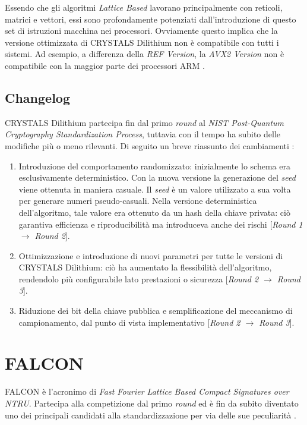 Essendo che gli algoritmi \textit{Lattice Based} lavorano principalmente con reticoli, matrici e vettori, essi sono profondamente potenziati dall'introduzione di questo set di istruzioni macchina nei processori. Ovviamente questo implica che la versione ottimizzata di CRYSTALS Dilithium non è compatibile con tutti i sistemi. Ad esempio, a differenza della \textit{REF Version}, la \textit{AVX2 Version} non è compatibile con la maggior parte dei processori ARM \cite{nist-pqc}.

\subsection{Changelog}

CRYSTALS Dilithium partecipa fin dal primo \textit{round} al \textit{NIST Post-Quantum Cryptography Standardization Process}\cite{nist-pqc}, tuttavia con il tempo ha subito delle modifiche più o meno rilevanti. Di seguito un breve riassunto dei cambiamenti \cite{crystalsdilithium-submissionpackage-three}:
\begin{enumerate}
    \item Introduzione del comportamento randomizzato: inizialmente lo schema era esclusivamente deterministico. Con la nuova versione la generazione del \textit{seed} viene ottenuta in maniera casuale. Il \textit{seed} è un valore utilizzato a sua volta per generare numeri pseudo-casuali. Nella versione deterministica dell'algoritmo, tale valore era ottenuto da un hash della chiave privata: ciò garantiva efficienza e riproducibilità ma introduceva anche dei rischi [\textit{Round 1 $\rightarrow$ Round 2}].
    \item Ottimizzazione e introduzione di nuovi parametri per tutte le versioni di CRYSTALS Dilithium: ciò ha aumentato la flessibilità dell'algoritmo, rendendolo più configurabile lato prestazioni o sicurezza [\textit{Round 2 $\rightarrow$ Round 3}].
    \item Riduzione dei bit della chiave pubblica e semplificazione del meccanismo di campionamento, dal punto di vista implementativo [\textit{Round 2 $\rightarrow$ Round 3}].
\end{enumerate}

\section{FALCON}

FALCON è l'acronimo di \textit{Fast Fourier Lattice Based Compact Signatures over NTRU}. Partecipa alla competizione dal primo \textit{round} ed è fin da subito diventato uno dei principali candidati alla standardizzazione per via delle sue peculiarità \cite{falcon-website}.

